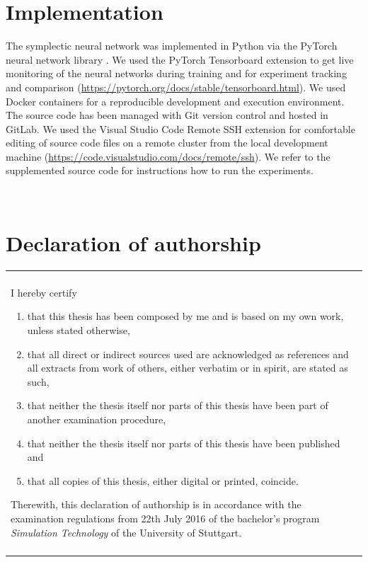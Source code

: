 \documentclass[twoside,a4paper]{article}
\begin{document}
%
%
\clearpage\newpage\null %
\newpage
\begin{appendices}
\section{Implementation}

The symplectic neural network was implemented in Python via the PyTorch neural network
library \cite{PyTorch2019}. We used the PyTorch Tensorboard extension to get 
live monitoring of the neural networks during training and for experiment tracking 
and comparison (\url{https://pytorch.org/docs/stable/tensorboard.html}). 
We used Docker containers for a reproducible
development and execution environment. The source code has been managed with Git
version control and hosted in GitLab. We used the Visual Studio Code Remote SSH extension
for comfortable editing of source code files on
a remote cluster from the local development machine
(\url{https://code.visualstudio.com/docs/remote/ssh}). We refer to the supplemented
source code for instructions how to run the experiments.

\newpage~\newpage
\section{Declaration of authorship}

\vspace{3cm}

\begin{table}[h!]
\centering
\begin{tabular}{|p{13cm}|}
\hline\\
	I hereby certify
	\begin{enumerate}
		\item that this thesis has been composed by me and is based on my own work, unless stated otherwise,
		\item that all direct or indirect sources used are acknowledged as references and all extracts from work of others, either verbatim or in spirit, are stated as such,
		\item that neither the thesis itself nor parts of this thesis have been part of another examination procedure,
		\item that neither the thesis itself nor parts of this thesis have been published and
		\item that all copies of this thesis, either digital or printed, coincide.
	\end{enumerate}
	Therewith, this declaration of authorship is in accordance with the examination regulations from 22th July 2016 of the bachelor's program \emph{Simulation Technology} of the University of Stuttgart.\\\\
\hline
\end{tabular}
\end{table}


\end{appendices}
\end{document}

